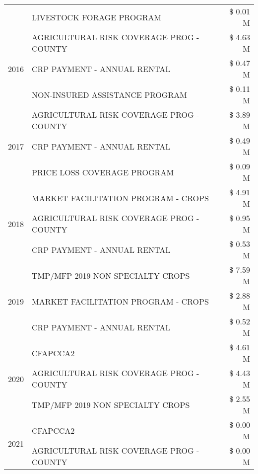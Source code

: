 \begin{tabular}{llr}
 & LIVESTOCK FORAGE PROGRAM & \$ 0.01 M \\
\cline{1-3}
\multirow[t]{3}{*}{2016} & AGRICULTURAL RISK COVERAGE PROG - COUNTY      & \$ 4.63 M \\
 & CRP PAYMENT - ANNUAL RENTAL                   & \$ 0.47 M \\
 & NON-INSURED ASSISTANCE PROGRAM                & \$ 0.11 M \\
\cline{1-3}
\multirow[t]{3}{*}{2017} & AGRICULTURAL RISK COVERAGE PROG - COUNTY & \$ 3.89 M \\
 & CRP PAYMENT - ANNUAL RENTAL & \$ 0.49 M \\
 & PRICE LOSS COVERAGE PROGRAM & \$ 0.09 M \\
\cline{1-3}
\multirow[t]{3}{*}{2018} & MARKET FACILITATION PROGRAM - CROPS & \$ 4.91 M \\
 & AGRICULTURAL RISK COVERAGE PROG - COUNTY & \$ 0.95 M \\
 & CRP PAYMENT - ANNUAL RENTAL & \$ 0.53 M \\
\cline{1-3}
\multirow[t]{3}{*}{2019} & TMP/MFP 2019 NON SPECIALTY CROPS & \$ 7.59 M \\
 & MARKET FACILITATION PROGRAM - CROPS & \$ 2.88 M \\
 & CRP PAYMENT - ANNUAL RENTAL & \$ 0.52 M \\
\cline{1-3}
\multirow[t]{3}{*}{2020} & CFAPCCA2 & \$ 4.61 M \\
 & AGRICULTURAL RISK COVERAGE PROG - COUNTY & \$ 4.43 M \\
 & TMP/MFP 2019 NON SPECIALTY CROPS & \$ 2.55 M \\
\cline{1-3}
\multirow[t]{2}{*}{2021} & CFAPCCA2 & \$ 0.00 M \\
 & AGRICULTURAL RISK COVERAGE PROG - COUNTY & \$ 0.00 M \\
\cline{1-3}
\bottomrule
\end{tabular}
